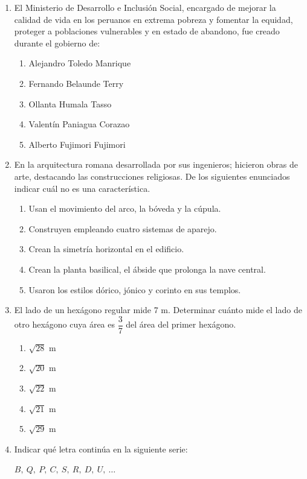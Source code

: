 \begin{enumerate}
	\item El Ministerio de Desarrollo e Inclusión Social, encargado de mejorar la calidad de vida en los peruanos en extrema pobreza y fomentar la equidad, proteger a poblaciones vulnerables y en estado de abandono, fue creado durante el gobierno de:
	\begin{enumerate}[label=\alph*)]
		\item Alejandro Toledo Manrique
		\item Fernando Belaunde Terry
		\item Ollanta Humala Tasso
		\item Valentín Paniagua Corazao
		\item Alberto Fujimori Fujimori
	\end{enumerate}
	
	\item En la arquitectura romana desarrollada por sus ingenieros; hicieron obras de arte, destacando las construcciones religiosas. De los siguientes enunciados indicar cuál no es una característica.
	\begin{enumerate}[label=\alph*)]
		\item Usan el movimiento del arco, la bóveda y la cúpula.
		\item Construyen empleando cuatro sistemas de aparejo.
		\item Crean la simetría horizontal en el edificio.
		\item Crean la planta basilical, el ábside que prolonga la nave central.
		\item Usaron los estilos dórico, jónico y corinto en sus templos.
	\end{enumerate}
	
	
	\item El lado de un hexágono regular mide 7 m. Determinar cuánto mide el lado de otro hexágono cuya área es $\dfrac{3}{7}$ del área del primer hexágono.
	\begin{enumerate}[label=\alph*)]
		\item $\sqrt{28}$ m
		\item $\sqrt{20}$ m
		\item $\sqrt{22}$ m
		\item $\sqrt{21}$ m
		\item $\sqrt{29}$ m
	\end{enumerate}
	
	\item Indicar qué letra continúa en la siguiente serie:
	
	$B,\ Q,\ P,\ C,\ S,\ R,\ D,\ U,\ \ldots$
	

\end{enumerate}
